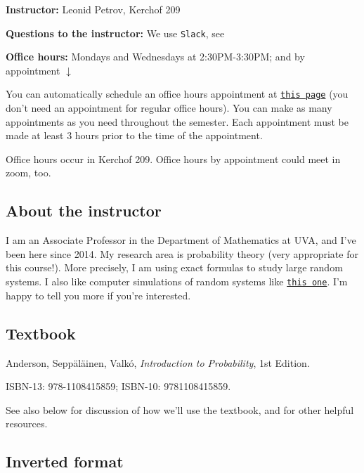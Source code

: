 \documentclass[oneside,11pt]{amsart}
\begin{document}
\bigskip

\textbf{Instructor:} Leonid Petrov, Kerchof 209

	\textbf{Questions to the instructor:} We use \texttt{Slack}, see 

	\textbf{Office hours:} 
	Mondays and Wednesdays at 2:30PM-3:30PM; and by appointment $\downarrow$
	
	You can automatically schedule an office hours appointment 
	at \href{https://lpetrov.cc/teaching/}{\texttt{this page}} (you don't need an appointment for 
	regular office hours).
	You can make as many appointments as you need throughout the semester. Each appointment
	must be made at least 3 hours prior to the time of the appointment.

	Office hours occur in Kerchof 209. Office hours by appointment
	could meet in zoom, too.
	
\subsection{About the instructor}
I am an Associate Professor in the Department of Mathematics at UVA, and I've
been here since 2014. My research area is probability theory (very appropriate
for this course!). More precisely, I am using exact formulas to study large
random systems. I also like computer simulations of random systems like 
\href{https://d3m0khvr0ybm92.cloudfront.net/img/blog/heart/UVA_colors_small.png}{\texttt{this one}}.
I'm happy to tell you more if you're
interested.

\subsection{Textbook}
\label{sub:main_textbook}

Anderson, Sepp\"al\"ainen, Valk\'o, \emph{Introduction to Probability}, 1st Edition.

ISBN-13: 978-1108415859; 
ISBN-10: 9781108415859.

See also  below for discussion 
of how we'll use the textbook,
and for other helpful resources.

\subsection{Inverted format}
\end{document}
